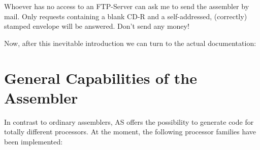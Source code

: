 \documentclass[12pt,twoside]{report}
\newcommand{\asname}{{AS}}
\begin{document}
Whoever has no access to an FTP-Server can ask me to send the assembler
by mail.  Only requests containing a blank CD-R and a self-addressed,
(correctly) stamped envelope will be answered.  Don't send any money!

Now, after this inevitable introduction we can turn to the actual
documentation:


\section{General Capabilities of the Assembler}

In contrast to ordinary assemblers, \asname{} offers the possibility to
generate code for totally different processors.  At the moment, the
following processor families have been implemented:
\end{document}
